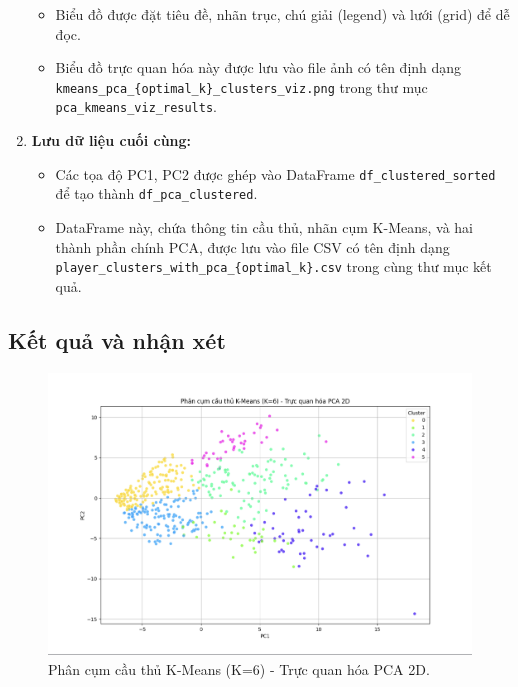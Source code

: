 \documentclass[12pt, a4paper]{report}
\begin{document}
\begin{enumerate}[label=\textbf{Bước \arabic*:}, leftmargin=*]
\begin{itemize}
        \item Biểu đồ được đặt tiêu đề, nhãn trục, chú giải (legend) và lưới (grid) để dễ đọc.
        \item Biểu đồ trực quan hóa này được lưu vào file ảnh có tên định dạng \texttt{kmeans\_pca\_\{optimal\_k\}\_clusters\_viz.png} trong thư mục \texttt{pca\_kmeans\_viz\_results}.
    \end{itemize}
    \item \textbf{Lưu dữ liệu cuối cùng:}
    \begin{itemize}
        \item Các tọa độ PC1, PC2 được ghép vào DataFrame \texttt{df\_clustered\_sorted} để tạo thành \texttt{df\_pca\_clustered}.
        \item DataFrame này, chứa thông tin cầu thủ, nhãn cụm K-Means, và hai thành phần chính PCA, được lưu vào file CSV có tên định dạng \texttt{player\_clusters\_with\_pca\_\{optimal\_k\}.csv} trong cùng thư mục kết quả.
    \end{itemize}
\end{enumerate}

\subsection{Kết quả và nhận xét} %

\begin{figure}[H]
    \centering
    \includegraphics[width=\textwidth]{pca_kmeans.png}
    \caption{Phân cụm cầu thủ K-Means (K=6) - Trực quan hóa PCA 2D.}
    \label{fig:pca_kmeans_viz}
\end{figure}
\end{document}
